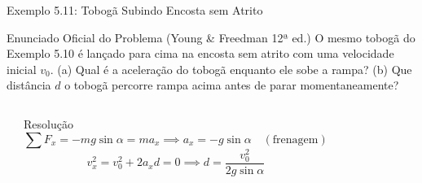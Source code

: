 \documentclass[10pt,aspectratio=169]{beamer}
\begin{document}
\begin{frame}{Exemplo 5.11: Tobogã Subindo Encosta sem Atrito}
    \begin{block}{Enunciado Oficial do Problema (Young \& Freedman 12ª ed.)}
        \small
        O mesmo tobogã do Exemplo 5.10 é lançado para cima na encosta sem atrito com uma velocidade inicial $v_0$. (a) Qual é a aceleração do tobogã enquanto ele sobe a rampa? (b) Que distância $d$ o tobogã percorre rampa acima antes de parar momentaneamente?
    \end{block}
    \begin{columns}[T]
        \begin{center}
        \end{center}
        \begin{exampleblock}{Resolução}
            \small
            $$\sum F_x = -mg \sin\alpha = m a_x \implies a_x = -g \sin\alpha \quad (\text{frenagem})$$
            $$v_x^2 = v_0^2 + 2 a_x d = 0 \implies d = \frac{v_0^2}{2g \sin\alpha}$$
        \end{exampleblock}
    \end{columns}
\end{frame}
\end{document}
